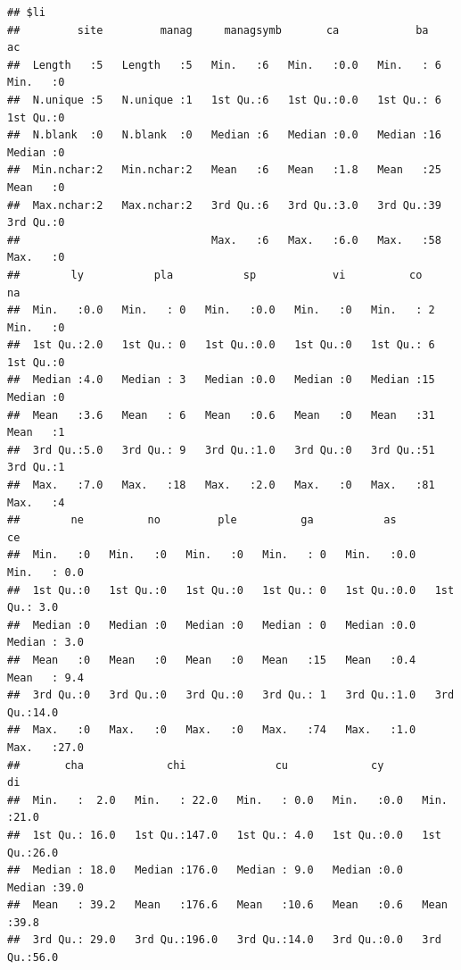 \documentclass[
]{article}
\newenvironment{Shaded}{\begin{snugshade}}{\end{snugshade}}
\newcommand{\FunctionTok}[1]{\textcolor[rgb]{0.13,0.29,0.53}{\textbf{#1}}}
\newcommand{\NormalTok}[1]{#1}
\newcommand{\SpecialCharTok}[1]{\textcolor[rgb]{0.81,0.36,0.00}{\textbf{#1}}}
\begin{document}
\begin{Shaded}
\end{Shaded}

\begin{verbatim}
## $li
##         site         manag     managsymb       ca            ba           ac   
##  Length   :5   Length   :5   Min.   :6   Min.   :0.0   Min.   : 6   Min.   :0  
##  N.unique :5   N.unique :1   1st Qu.:6   1st Qu.:0.0   1st Qu.: 6   1st Qu.:0  
##  N.blank  :0   N.blank  :0   Median :6   Median :0.0   Median :16   Median :0  
##  Min.nchar:2   Min.nchar:2   Mean   :6   Mean   :1.8   Mean   :25   Mean   :0  
##  Max.nchar:2   Max.nchar:2   3rd Qu.:6   3rd Qu.:3.0   3rd Qu.:39   3rd Qu.:0  
##                              Max.   :6   Max.   :6.0   Max.   :58   Max.   :0  
##        ly           pla           sp            vi          co           na   
##  Min.   :0.0   Min.   : 0   Min.   :0.0   Min.   :0   Min.   : 2   Min.   :0  
##  1st Qu.:2.0   1st Qu.: 0   1st Qu.:0.0   1st Qu.:0   1st Qu.: 6   1st Qu.:0  
##  Median :4.0   Median : 3   Median :0.0   Median :0   Median :15   Median :0  
##  Mean   :3.6   Mean   : 6   Mean   :0.6   Mean   :0   Mean   :31   Mean   :1  
##  3rd Qu.:5.0   3rd Qu.: 9   3rd Qu.:1.0   3rd Qu.:0   3rd Qu.:51   3rd Qu.:1  
##  Max.   :7.0   Max.   :18   Max.   :2.0   Max.   :0   Max.   :81   Max.   :4  
##        ne          no         ple          ga           as            ce      
##  Min.   :0   Min.   :0   Min.   :0   Min.   : 0   Min.   :0.0   Min.   : 0.0  
##  1st Qu.:0   1st Qu.:0   1st Qu.:0   1st Qu.: 0   1st Qu.:0.0   1st Qu.: 3.0  
##  Median :0   Median :0   Median :0   Median : 0   Median :0.0   Median : 3.0  
##  Mean   :0   Mean   :0   Mean   :0   Mean   :15   Mean   :0.4   Mean   : 9.4  
##  3rd Qu.:0   3rd Qu.:0   3rd Qu.:0   3rd Qu.: 1   3rd Qu.:1.0   3rd Qu.:14.0  
##  Max.   :0   Max.   :0   Max.   :0   Max.   :74   Max.   :1.0   Max.   :27.0  
##       cha             chi              cu             cy            di      
##  Min.   :  2.0   Min.   : 22.0   Min.   : 0.0   Min.   :0.0   Min.   :21.0  
##  1st Qu.: 16.0   1st Qu.:147.0   1st Qu.: 4.0   1st Qu.:0.0   1st Qu.:26.0  
##  Median : 18.0   Median :176.0   Median : 9.0   Median :0.0   Median :39.0  
##  Mean   : 39.2   Mean   :176.6   Mean   :10.6   Mean   :0.6   Mean   :39.8  
##  3rd Qu.: 29.0   3rd Qu.:196.0   3rd Qu.:14.0   3rd Qu.:0.0   3rd Qu.:56.0  

\end{verbatim}
\end{document}
